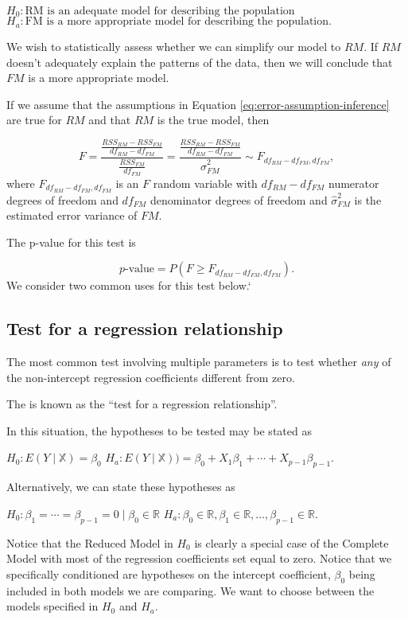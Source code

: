 \documentclass[
]{book}
\theoremstyle{definition}
\theoremstyle{definition}
\theoremstyle{definition}
\theoremstyle{definition}
\theoremstyle{remark}
\begin{document}
\(H_0: \text{RM is an adequate model for describing the population}\)
\(H_a: \text{FM is a more appropriate model for describing the population.}\)

We wish to statistically assess whether we can simplify our model to \(RM\). If \(RM\) doesn't adequately explain the patterns of the data, then we will conclude that \(FM\) is a more appropriate model.

If we assume that the assumptions in Equation
\eqref{eq:error-assumption-inference} are true for \(RM\) and that \(RM\) is the true model, then

\[
F=\frac{\frac{RSS_{RM}-RSS_{FM}}{df_{RM}-df_{FM}}}{\frac{RSS_{FM}}{df_{FM}}}=\frac{\frac{RSS_{RM}-RSS_{FM}}{df_{RM}-df_{FM}}}{\hat{\sigma}^2_{FM}}\sim F_{df_{RM}-df_{FM},df_{FM}}, \label{eq:f-stat-lh}
\]
where \(F_{df_{RM}-df_{FM},df_{FM}}\) is an \(F\) random variable with \(df_{RM}-df_{FM}\) numerator degrees of freedom and \(df_{FM}\) denominator degrees of freedom and \(\hat{\sigma}^2_{FM}\) is the estimated error variance of \(FM\).

The p-value for this test is

\[
p\text{-value}=P(F\geq F_{df_{RM}-df_{FM},df_{FM}}).
\]
We consider two common uses for this test below.`

\hypertarget{test-for-a-regression-relationship}{%
\subsection{Test for a regression relationship}\label{test-for-a-regression-relationship}}

The most common test involving multiple parameters is to test whether \emph{any} of the non-intercept regression coefficients different from zero.

The is known as the ``test for a regression relationship''.

In this situation, the hypotheses to be tested may be stated as

\(H_0: E(Y \mid \mathbb{X}) = \beta_0\)
\(H_a: E(Y\mid \mathbb{X})) = \beta_0 + X_1\beta_1 + \cdots + X_{p-1}\beta_{p-1}.\)

Alternatively, we can state these hypotheses as

\(H_0: \beta_1 = \cdots = \beta_{p-1} = 0 \mid \beta_0 \in \mathbb{R}\)
\(H_a: \beta_0 \in \mathbb{R}, \beta_1 \in \mathbb{R}, \ldots, \beta_{p-1}\in \mathbb{R}\).

Notice that the Reduced Model in \(H_0\) is clearly a special case of the Complete Model with most of the regression coefficients set equal to zero. Notice that we specifically conditioned are hypotheses on the intercept coefficient, \(\beta_0\) being included in both models we are comparing.
We want to choose between the models specified in \(H_0\) and \(H_a\).
\end{document}
